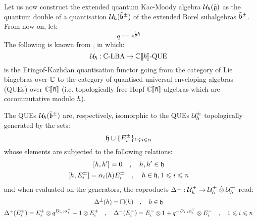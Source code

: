         Let us now construct the extended quantum Kac-Moody algebra $\mathcal{U}_{\hbar}(\tilde{\mathfrak{g}})$ as the quantum double of a quantisation $\mathcal{U}_{\hbar}(\tilde{\mathfrak{b}}^{\pm})$ of the extended Borel subalgebras $\tilde{\mathfrak{b}}^{\pm}$. From now on, let:
            $$q := e^{\frac12 \hbar}$$
        The following is known from \cite[Propositions 3.1 and 3.2]{etingof_kazhdan_quantisation_6}, in which:
            $$\mathcal{U}_{\hbar}: \mathbb{C}\text{-}\mathrm{LBA} \to \mathbb{C}[\![\hbar]\!]\text{-}\mathrm{QUE}$$
        is the Etingof-Kazhdan quantisation functor going from the category of Lie biagebras over $\mathbb{C}$ to the category of quantised universal enveloping algebras (QUEs) over $\mathbb{C}[\![\hbar]\!]$ (i.e. topologically free Hopf $\mathbb{C}[\![\hbar]\!]$-algebras which are cocommutative modulo $\hbar$).
        \begin{proposition} \label{prop: extended_quantum_borel_subalgebras}
            The QUEs $\mathcal{U}_{\hbar}(\tilde{\mathfrak{b}}^{\pm})$ are, respectively, isomorphic to the QUEs $\mathcal{U}_{\hbar}^{\pm}$ topologically generated by the sets:
                $$\mathfrak{h} \cup \{ E_i^{\pm} \}_{1 \leqslant i \leqslant n}$$
            whose elements are subjected to the following relations:
                \begin{equation} \label{equation: extended_quantum_borel_subalgebras_commutation_relations}
                    \begin{gathered}
                        [h, h'] = 0 \quad, \quad h, h' \in \h
                        \\
                        [h, E_i^{\pm}] = \alpha_i(h) E_i^{\pm} \quad, \quad h \in \h, 1 \leq i \leq n 
                    \end{gathered} 
                \end{equation}
            and when evaluated on the generators, the coproducts $\Delta^{\pm}: \calU_{\hbar}^{\pm} \to \calU_{\hbar}^{\pm} \hattensor \calU_{\hbar}^{\pm}$ read:
                \begin{equation} \label{equation: extended_quantum_borel_subalgebras_coproducts}
                    \begin{gathered}
                        \Delta^{\pm}(h) = \Box(h) \quad, \quad h \in \h
                        \\
                        \Delta^+(E_i^+) = E_i^+ \tensor q^{D_{i, i} \alpha_i^{\vee}} + 1 \tensor E_i^+ \quad, \quad \Delta^-(E_i^-) = E_i^- \tensor 1 + q^{-D_{i, i} \alpha_i^{\vee}} \tensor E_i^- \quad, \quad 1 \leq i \leq n 
                    \end{gathered}
                \end{equation}
        \end{proposition}
